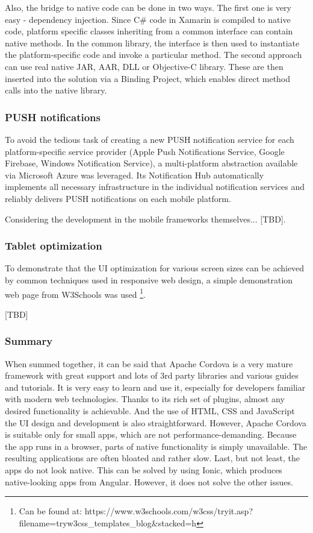 \documentclass[english,master,public,dept460,male,cpdeclaration,oneside]{diploma}
\begin{document}
Also, the bridge to native code can be done in two ways. The first one is very easy - dependency injection. Since C\# code in Xamarin is compiled to native code, platform specific classes inheriting from a common interface can contain native methods. In the common library, the interface is then used to instantiate the platform-specific code and invoke a particular method. The second approach can use real native JAR, AAR, DLL or Objective-C library. These are then inserted into the solution via a Binding Project, which enables direct method calls into the native library.

\subsubsection{PUSH notifications}
To avoid the tedious task of creating a new PUSH notification service for each platform-specific service provider (Apple Push Notifications Service, Google Firebase, Windows Notification Service), a multi-platform abstraction available via Microsoft Azure was leveraged. Its Notification Hub automatically implements all necessary infrastructure in the individual notification services and reliably delivers PUSH notifications on each mobile platform.

Considering the development in the mobile frameworks themselves... [TBD].

\subsubsection{Tablet optimization}
To demonstrate that the UI optimization for various screen sizes can be achieved by common techniques used in responsive web design, a simple demonstration web page from W3Schools was used \footnote{Can be found at: https://www.w3schools.com/w3css/tryit.asp?filename=tryw3css\_templates\_blog\&stacked=h}.

[TBD]

\subsubsection{Summary}
When summed together, it can be said that Apache Cordova is a very mature framework with great support and lots of 3rd party libraries and various guides and tutorials. It is very easy to learn and use it, especially for developers familiar with modern web technologies. Thanks to its rich set of plugins, almost any desired functionality is achievable. And the use of HTML, CSS and JavaScript the UI design and development is also straightforward. However, Apache Cordova is suitable only for small apps, which are not performance-demanding. Because the app runs in a browser, parts of native functionality is simply unavailable. The resulting applications are often bloated and rather slow. Last, but not least, the apps do not look native. This can be solved by using Ionic, which produces native-looking apps from Angular. However, it does not solve the other issues. 
\end{document}

